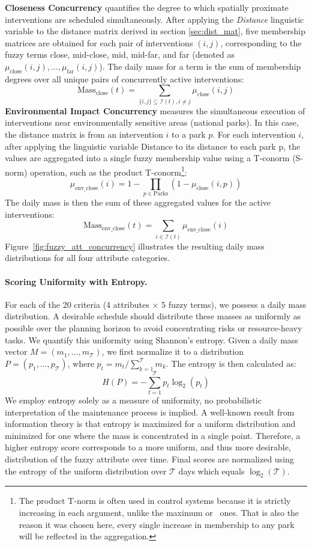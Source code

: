 \textbf{Closeness Concurrency} quantifies the degree to which spatially proximate interventions are scheduled simultaneously. After applying the \textit{Distance} linguistic variable to the distance matrix derived in section \ref{sec:dist_mat}, five membership matrices are obtained for each pair of interventions $(i, j)$, corresponding to the fuzzy terms close, mid-close, mid, mid-far, and far (denoted as $\mu_{\text{close}}(i, j),\dots ,\mu_{\text{far}}(i, j)$). The daily mass for a term is the sum of membership degrees over all unique pairs of concurrently active interventions:
\[
    \text{Mass}_{\text{close}}(t) = \sum_{\{i,j\} \subseteq \mathcal{I}(t), i \neq j} \mu_{\text{close}}(i, j)
\]
\textbf{Environmental Impact Concurrency} measures the simultaneous execution of interventions near environmentally sensitive areas (national parks). In this case, the distance matrix is from an intervention $i$ to a park $p$. 
For each intervention $i$, after applying the linguistic variable Distance to its distance to each park p, the values are aggregated into a single fuzzy membership value using a T-conorm (S-norm) operation, 
such as the product T-conorm\footnote{The product T-norm is often used in control systems because it is strictly increasing in each argument, unlike the maximum or \luka~ones. That is also the reason it was chosen here, every single increase in membership to any park will be reflected in the aggregation.}:
\[\mu_{\text{env\_close}}(i) =  1 - \prod_{p \in \text{Parks}} (1-\mu_{\text{close}}(i, p))\]
The daily mass is then the sum of these aggregated values for the active interventions: \[\text{Mass}_{\text{env\_close}}(t) = \sum_{i \in \mathcal{I}(t)} \mu_{\text{env\_close}}(i)\] Figure~\ref{fig:fuzzy_att_concurrency} illustrates the resulting daily mass distributions for all four attribute categories.



\paragraph{Scoring Uniformity with Entropy.}
For each of the 20 criteria (4 attributes $\times$ 5 fuzzy terms), we possess a daily mass distribution. A desirable schedule should distribute these masses as uniformly as possible over the planning horizon to avoid concentrating risks or resource-heavy tasks. We quantify this uniformity using Shannon's entropy. Given a daily mass vector $M = (m_1, \dots, m_\mathcal{T})$, we first normalize it to a distribution $P = (p_1, \dots, p_\mathcal{T})$, where $p_t = m_t / \sum_{k=1}^\mathcal{T} m_k$. The entropy is then calculated as:
\[
H(P) = - \sum_{t=1}^{\mathcal{T}} p_t \log_2(p_t)
\]
We employ entropy solely as a measure of uniformity, no probabilistic interpretation of the maintenance process is implied. A well-known result from  information theory \cite{Entropy} is that entropy is maximized for a uniform distribution and minimized for one where the mass is concentrated in a single point. Therefore, a higher entropy score corresponds to a more uniform, and thus more desirable, distribution of the fuzzy attribute over time. Final scores are normalized using the entropy of the uniform distribution over $\mathcal{T}$ days which equals $\log_2(\mathcal{T})$.\\

